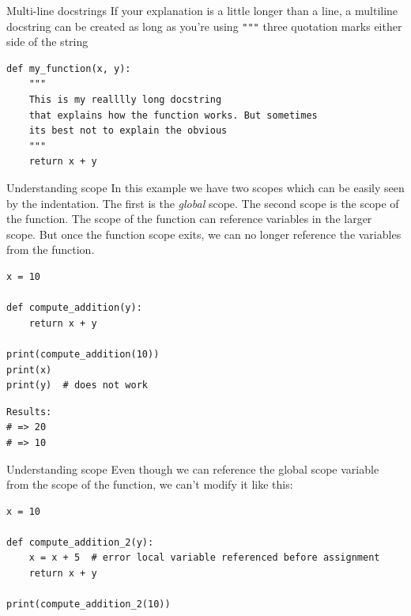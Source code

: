 \documentclass[10pt]{beamer}
\begin{document}
\begin{frame}[label={sec:orgb8fc65e},fragile]{Multi-line docstrings}
 If your explanation is a little longer than a line, a multiline docstring can be
created as long as you're using \texttt{"""} three quotation marks either side of the string

\begin{verbatim}
def my_function(x, y):
    """
    This is my realllly long docstring
    that explains how the function works. But sometimes
    its best not to explain the obvious
    """
    return x + y
\end{verbatim}
\end{frame}

\begin{frame}[label={sec:orgb793c6c},fragile]{Understanding scope}
 In this example we have two scopes which can be easily seen by the indentation. The
first is the \emph{global} scope. The second scope is the scope of the function. The scope
of the function can reference variables in the larger scope. But once the function
scope exits, we can no longer reference the variables from the function.

\begin{verbatim}
x = 10

def compute_addition(y):
    return x + y

print(compute_addition(10))
print(x)
print(y)  # does not work
\end{verbatim}

\begin{verbatim}
Results: 
# => 20
# => 10
\end{verbatim}
\end{frame}

\begin{frame}[label={sec:org1f75c46},fragile]{Understanding scope}
 Even though we can reference the global scope variable from the scope of the
function, we can't modify it like this:

\begin{verbatim}
x = 10

def compute_addition_2(y):
    x = x + 5  # error local variable referenced before assignment
    return x + y

print(compute_addition_2(10))
\end{verbatim}
\end{frame}
\end{document}
